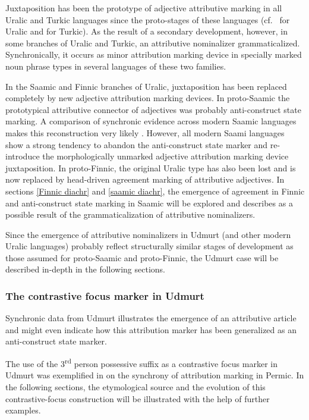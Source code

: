 Juxtaposition has been the prototype of adjective attributive marking in all Uralic and Turkic languages since the proto-stages of these languages (cf.~\citealt[80–81]{decsy1990} for Uralic and \citealt[75–76]{decsy1998} for Turkic). As the result of a secondary development, however, in some branches of Uralic and Turkic, an attributive nominalizer grammaticalized. Synchronically, it occurs as minor attribution marking device in specially marked noun phrase types in several languages of these two families.%

In the Saamic and Finnic branches of Uralic, juxtaposition has been replaced completely by new adjective attribution marking devices. In proto-Saamic the prototypical attributive connector of adjectives was probably anti-construct state marking. A comparison of synchronic evidence across modern Saamic languages makes this reconstruction very likely  \citep{riesler2006b}. However, all modern Saami languages show a strong tendency to abandon the anti-construct state marker and re-introduce the morphologically unmarked adjective attribution marking device juxtaposition. In proto-Finnic, the original Uralic type has also been lost and is now replaced by head-driven agreement marking of attributive adjectives. In sections \ref{Finnic diachr} and \ref{saamic diachr}, the emergence of agreement in Finnic and anti-construct state marking in Saamic will be explored and describes as a possible result of the grammaticalization of attributive nominalizers. 

Since the emergence of attributive nominalizers in Udmurt (and other modern Uralic languages) probably reflect structurally similar stages of development as those assumed for proto-Saamic and proto-Finnic, the Udmurt case will be described in-depth in the following sections.

\subsubsection{The contrastive focus marker in Udmurt} \label{udmurt diachr}

Synchronic data from Udmurt illustrates the emergence of an attributive article and might even indicate how this attribution marker has been generalized as an anti-construct state marker. 

The use of the 3\textsuperscript{rd} person possessive suffix as a contrastive focus marker in Udmurt was exemplified in  on the synchrony of attribution marking in Permic. In the following sections, the etymological source and the evolution of this contrastive-focus construction will be illustrated with the help of further examples.

